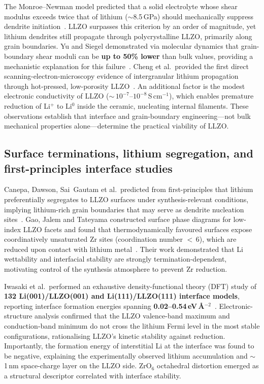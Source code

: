 \documentclass[12pt,a4paper,oneside]{book}
\begin{document}
The Monroe--Newman model predicted that a solid electrolyte whose shear modulus exceeds twice that of lithium ($\sim$8.5\,GPa) should mechanically suppress dendrite initiation~\cite{Monroe2005}. LLZO surpasses this criterion by an order of magnitude, yet lithium dendrites still propagate through polycrystalline LLZO, primarily along grain boundaries. Yu and Siegel demonstrated via molecular dynamics that grain-boundary shear moduli can be \textbf{up to 50\% lower} than bulk values, providing a mechanistic explanation for this failure~\cite{Yu2018}. Cheng et al.\ provided the first direct scanning-electron-microscopy evidence of intergranular lithium propagation through hot-pressed, low-porosity LLZO~\cite{Cheng2017}. An additional factor is the modest electronic conductivity of LLZO ($\sim$\,$10^{-7}$--$10^{-8}$\,S\,cm$^{-1}$), which enables premature reduction of Li$^+$ to Li$^0$ inside the ceramic, nucleating internal filaments. These observations establish that interface and grain-boundary engineering---not bulk mechanical properties alone---determine the practical viability of LLZO.

\subsection{Surface terminations, lithium segregation, and first-principles interface studies}

Canepa, Dawson, Sai~Gautam et al.\ predicted from first-principles that lithium preferentially segregates to LLZO surfaces under synthesis-relevant conditions, implying lithium-rich grain boundaries that may serve as dendrite nucleation sites~\cite{Canepa2018}. Gao, Jalem and Tateyama constructed surface phase diagrams for low-index LLZO facets and found that thermodynamically favoured surfaces expose coordinatively unsaturated Zr sites (coordination number $<$\,6), which are reduced upon contact with lithium metal~\cite{Gao2020}. Their work demonstrated that Li wettability and interfacial stability are strongly termination-dependent, motivating control of the synthesis atmosphere to prevent Zr reduction.

Iwasaki et al.\ performed an exhaustive density-functional theory (DFT) study of \textbf{132 Li(001)/LLZO(001) and Li(111)/LLZO(111) interface models}, reporting interface formation energies spanning \textbf{0.02--0.54\,eV\,\AA$^{-2}$}~\cite{Iwasaki2022}. Electronic-structure analysis confirmed that the LLZO valence-band maximum and conduction-band minimum do not cross the lithium Fermi level in the most stable configurations, rationalising LLZO's kinetic stability against reduction. Importantly, the formation energy of interstitial Li at the interface was found to be negative, explaining the experimentally observed lithium accumulation and $\sim$1\,nm space-charge layer on the LLZO side. ZrO$_6$ octahedral distortion emerged as a structural descriptor correlated with interface stability.
\end{document}
